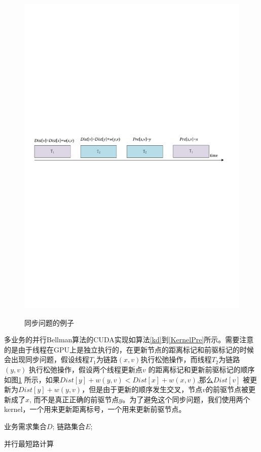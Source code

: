 \begin{figure}
\setlength{\abovecaptionskip}{-0.5cm}
\begin{center}
{\includegraphics[width=0.8 \textwidth]{figures/SynPro.pdf}}
\end{center}
\caption{{\footnotesize{同步问题的例子}}}
\label{SynPro}
\end{figure}
多业务的并行Bellman算法的CUDA实现如算法\ref{kd}到\ref{KernelPre}所示。需要注意的是由于线程在GPU上是独立执行的，在更新节点的距离标记和前驱标记的时候会出现同步问题，假设线程$T_1$为链路$(x,v)$执行松弛操作，而线程$T_2$为链路$(y,v)$ 执行松弛操作，假设两个线程更新点$v$ 的距离标记和更新前驱标记的顺序如图\ref{SynPro} 所示，如果$Dist[y] + w(y, v) < Dist[x] +w(x, v)$,那么$Dist[v]$ 被更新为$Dist[y] + w(y, v)$，但是由于更新的顺序发生交叉，节点$v$的前驱节点被更新成了$x$, 而不是真正正确的前驱节点$y$。为了避免这个同步问题，我们使用两个kernel，一个用来更新距离标号，一个用来更新前驱节点。
\begin{algorithm}[t]
\begin{algorithmic}[1]
\Require
业务需求集合$D$;
链路集合$E$;
\EndWhile
{}
\end{algorithmic}
\caption{{并行最短路计算}}
\label{kd}
\end{algorithm}

